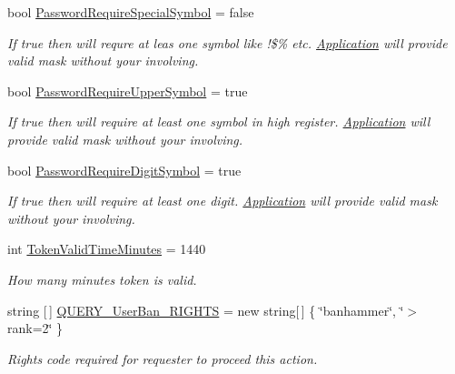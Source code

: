\begin{DoxyCompactItemize}
bool \mbox{\hyperlink{class_authority_controller_1_1_data_1_1_application_1_1_config_ae20771ce3750b078895ef998a57d8773}{Password\+Require\+Special\+Symbol}} = false
\begin{DoxyCompactList}\small\item\em If true then will requre at leas one symbol like !\$\% etc. \mbox{\hyperlink{namespace_authority_controller_1_1_data_1_1_application}{Application}} will provide valid mask without your involving. \end{DoxyCompactList}\item 
bool \mbox{\hyperlink{class_authority_controller_1_1_data_1_1_application_1_1_config_a8ac9eca1d9766ddc46f9177133dd8b6e}{Password\+Require\+Upper\+Symbol}} = true
\begin{DoxyCompactList}\small\item\em If true then will require at least one symbol in high register. \mbox{\hyperlink{namespace_authority_controller_1_1_data_1_1_application}{Application}} will provide valid mask without your involving. \end{DoxyCompactList}\item 
bool \mbox{\hyperlink{class_authority_controller_1_1_data_1_1_application_1_1_config_a2f39b6a13a99fc5a433d333b086fdcad}{Password\+Require\+Digit\+Symbol}} = true
\begin{DoxyCompactList}\small\item\em If true then will require at least one digit. \mbox{\hyperlink{namespace_authority_controller_1_1_data_1_1_application}{Application}} will provide valid mask without your involving. \end{DoxyCompactList}\item 
int \mbox{\hyperlink{class_authority_controller_1_1_data_1_1_application_1_1_config_ad548f5fee544802b6c900eef6da88332}{Token\+Valid\+Time\+Minutes}} = 1440
\begin{DoxyCompactList}\small\item\em How many minutes token is valid. \end{DoxyCompactList}\item 
string \mbox{[}$\,$\mbox{]} \mbox{\hyperlink{class_authority_controller_1_1_data_1_1_application_1_1_config_a6d369c29beecb9c80a65168d72e2ae06}{Q\+U\+E\+R\+Y\+\_\+\+User\+Ban\+\_\+\+R\+I\+G\+H\+TS}} = new string\mbox{[}$\,$\mbox{]} \{ \char`\"{}banhammer\char`\"{}, \char`\"{}$>$rank=2\char`\"{} \}
\begin{DoxyCompactList}\small\item\em Rights code required for requester to proceed this action. \end{DoxyCompactList}\item 

\end{DoxyCompactItemize}
